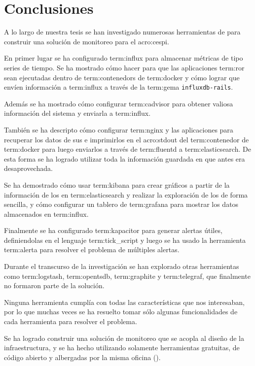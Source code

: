 \newpage
\section{Conclusiones}
\label{conclusiones}

A lo largo de nuestra tesis se han investigado numerosas herramientas de
 para construir una solución de monitoreo para el
\gls{acro:cespi}.

En primer lugar se ha configurado \gls{term:influx} para almacenar métricas de
tipo series de tiempo. Se ha mostrado cómo hacer para que las aplicaciones
\gls{term:ror} sean ejecutadas dentro de \glspl{term:contenedor} de
\gls{term:docker} y cómo lograr que envíen información a \gls{term:influx} a
través de la \gls{term:gema} \texttt{influxdb-rails}.

Además se ha mostrado cómo configurar \gls{term:cadvisor} para
obtener valiosa información del sistema y enviarla a \gls{term:influx}.

También se ha descripto cómo configurar \gls{term:nginx} y las aplicaciones
para recuperar los datos de sus  e imprimirlos en el \gls{acro:stdout}
del \gls{term:contenedor} de \gls{term:docker} para luego enviarlos a
través de \gls{term:fluentd} a \gls{term:elasticsearch}. De esta forma se ha
logrado utilizar toda la información guardada en  que antes era
desaprovechada.

Se ha demostrado cómo usar \gls{term:kibana} para crear gráficos a partir de la
información de los  en \gls{term:elasticsearch} y realizar la exploración
de los  de forma sencilla, y cómo configurar un tablero de
\gls{term:grafana} para mostrar los datos almacenados en \gls{term:influx}.

Finalmente se ha configurado \gls{term:kapacitor} para generar alertas útiles,
definiendolas en el lenguaje \gls{term:tick_script} y luego se ha usado la
herramienta \gls{term:alerta} para resolver el problema de múltiples alertas.

Durante el transcurso de la investigación se han explorado otras
herramientas como \gls{term:logstash}, \gls{term:opentsdb}, \gls{term:graphite}
y \gls{term:telegraf}, que finalmente no formaron parte de la solución.

Ninguna herramienta cumplía con todas las características que nos interesaban,
por lo que muchas veces se ha resuelto tomar sólo algunas funcionalidades de
cada herramienta para resolver el problema.

Se ha logrado construir una solución de monitoreo que se acopla al diseño de la
infraestructura, y se ha hecho utilizando solamente herramientas gratuitas,
de código abierto y albergadas por la misma oficina ().

